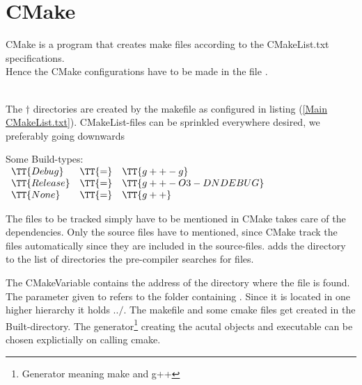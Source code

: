 \section{CMake}\label{sec:CMake}
CMake is a program that creates make files according to the CMakeList.txt specifications.\\
Hence the CMake configurations have to be made in the file .
\begin{center}

\end{center}
\ \\
The $\dagger$ directories are created by the makefile as configured in listing (\ref{Main CMakeList.txt}). CMakeList-files can be sprinkled everywhere desired, we preferably going downwards

Some Build-types:\\
$\begin{array}{lll}
\TT{Debug} &\TT{=} & \TT{g++ -g}\\ 
\TT{Release} &\TT{=} & \TT{g++ -O3 -DNDEBUG}\\
\TT{None} &\TT{=} & \TT{g++}\\
\end{array}$



\newpage
{}


The files to be tracked simply have to be mentioned in  CMake takes care of the dependencies. Only the source files  have to mentioned, since CMake track the  files automatically since they are included in the source-files.
 adds the directory to the list of directories the pre-compiler searches for files.


The CMakeVariable  contains the address of the directory where the file  is found. %
{}
The parameter given to  refers to the folder containing . Since it is located in one higher hierarchy it holds ..$/$.
The makefile and some cmake files get created in the Built-directory.
The generator\footnote{Generator meaning make and g++} creating the acutal objects and executable can be chosen explictially on calling cmake. 

